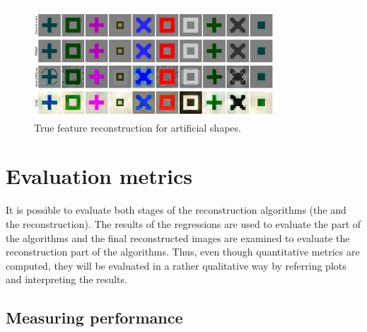 \begin{figure}[ht]
    \centering
    \includegraphics[width=0.8\textwidth]{plots/baseline_qual_true_recon_art.JPEG}
    \caption[True feature reconstruction for artificial shapes]{True feature reconstruction for artificial shapes. }\label{fig:baselinetruerecon_art}
\end{figure}


\section{Evaluation metrics}

It is possible to evaluate both stages of the reconstruction algorithms (the  and the reconstruction). The results of the regressions are used to evaluate the  part of the algorithms and the final reconstructed images are examined to evaluate the reconstruction part of the algorithms.  Thus, even though quantitative metrics are computed, they will be evaluated in a rather qualitative way by referring plots and interpreting the results.


\subsection{Measuring  performance}

